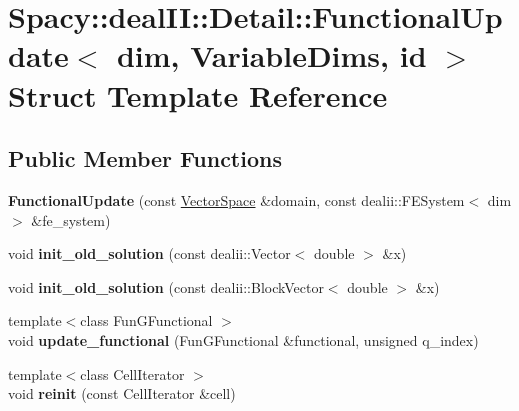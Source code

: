 \hypertarget{structSpacy_1_1dealII_1_1Detail_1_1FunctionalUpdate}{\section{\-Spacy\-:\-:deal\-I\-I\-:\-:\-Detail\-:\-:\-Functional\-Update$<$ dim, \-Variable\-Dims, id $>$ \-Struct \-Template \-Reference}
\label{structSpacy_1_1dealII_1_1Detail_1_1FunctionalUpdate}
}
\subsection*{\-Public \-Member \-Functions}
\begin{DoxyCompactItemize}
\item 
\hypertarget{structSpacy_1_1dealII_1_1Detail_1_1FunctionalUpdate_ab821cbb044f46ced9517d1232ba7aba3}{{\bfseries \-Functional\-Update} (const \hyperlink{classSpacy_1_1VectorSpace}{\-Vector\-Space} \&domain, const dealii\-::\-F\-E\-System$<$ dim $>$ \&fe\-\_\-system)}\label{structSpacy_1_1dealII_1_1Detail_1_1FunctionalUpdate_ab821cbb044f46ced9517d1232ba7aba3}

\item 
\hypertarget{structSpacy_1_1dealII_1_1Detail_1_1FunctionalUpdate_a654de56746651a0980548dee8d43b8c1}{void {\bfseries init\-\_\-old\-\_\-solution} (const dealii\-::\-Vector$<$ double $>$ \&x)}\label{structSpacy_1_1dealII_1_1Detail_1_1FunctionalUpdate_a654de56746651a0980548dee8d43b8c1}

\item 
\hypertarget{structSpacy_1_1dealII_1_1Detail_1_1FunctionalUpdate_ad8023b49135e2c8429b40c898ec7e031}{void {\bfseries init\-\_\-old\-\_\-solution} (const dealii\-::\-Block\-Vector$<$ double $>$ \&x)}\label{structSpacy_1_1dealII_1_1Detail_1_1FunctionalUpdate_ad8023b49135e2c8429b40c898ec7e031}

\item 
\hypertarget{structSpacy_1_1dealII_1_1Detail_1_1FunctionalUpdate_ac5dc29b3e32d0af45014662ff0c68b02}{{\footnotesize template$<$class Fun\-G\-Functional $>$ }\\void {\bfseries update\-\_\-functional} (\-Fun\-G\-Functional \&functional, unsigned q\-\_\-index)}\label{structSpacy_1_1dealII_1_1Detail_1_1FunctionalUpdate_ac5dc29b3e32d0af45014662ff0c68b02}

\item 
\hypertarget{structSpacy_1_1dealII_1_1Detail_1_1FunctionalUpdate_a1cc737c45f26b22938974db684b32adc}{{\footnotesize template$<$class Cell\-Iterator $>$ }\\void {\bfseries reinit} (const \-Cell\-Iterator \&cell)}\label{structSpacy_1_1dealII_1_1Detail_1_1FunctionalUpdate_a1cc737c45f26b22938974db684b32adc}

\end{DoxyCompactItemize}
